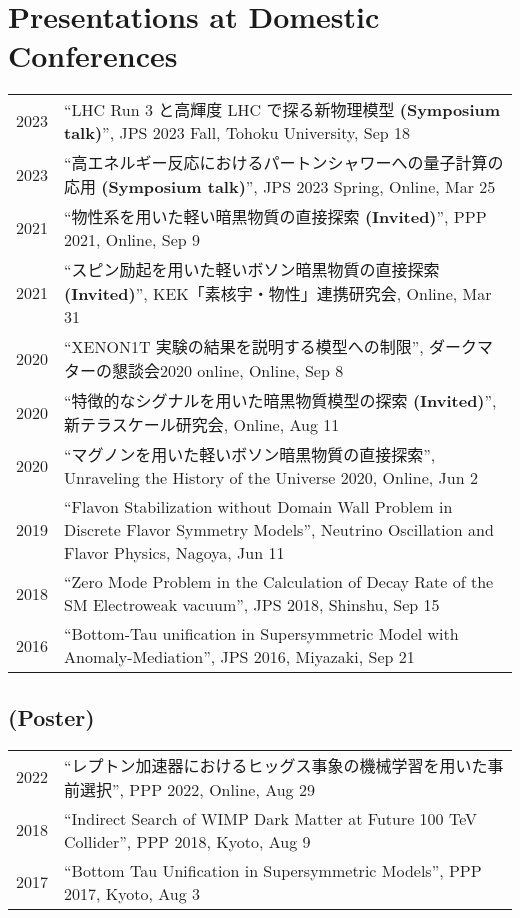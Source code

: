 \documentclass[12pt]{article}
\begin{document}
\section*{Presentations at Domestic Conferences}
\begin{table}[H]\begin{tabular}{lp{6in}}2023 & ``LHC Run 3 と高輝度 LHC で探る新物理模型 \textbf{(Symposium talk)}'', JPS 2023 Fall, Tohoku University, Sep 18 \\2023 & ``高エネルギー反応におけるパートンシャワーへの量子計算の応用 \textbf{(Symposium talk)}'', JPS 2023 Spring, Online, Mar 25 \\2021 & ``物性系を用いた軽い暗黒物質の直接探索 \textbf{(Invited)}'', PPP 2021, Online, Sep 9 \\2021 & ``スピン励起を用いた軽いボソン暗黒物質の直接探索 \textbf{(Invited)}'', KEK「素核宇・物性」連携研究会, Online, Mar 31 \\2020 & ``XENON1T 実験の結果を説明する模型への制限'', ダークマターの懇談会2020 online, Online, Sep 8 \\2020 & ``特徴的なシグナルを用いた暗黒物質模型の探索 \textbf{(Invited)}'', 新テラスケール研究会, Online, Aug 11 \\2020 & ``マグノンを用いた軽いボソン暗黒物質の直接探索'', Unraveling the History of the Universe 2020, Online, Jun 2 \\2019 & ``Flavon Stabilization without Domain Wall Problem in Discrete Flavor Symmetry Models'', Neutrino Oscillation and Flavor Physics, Nagoya, Jun 11 \\2018 & ``Zero Mode Problem in the Calculation of Decay Rate of the SM Electroweak vacuum'', JPS 2018, Shinshu, Sep 15 \\2016 & ``Bottom-Tau unification in Supersymmetric Model with Anomaly-Mediation'', JPS 2016, Miyazaki, Sep 21 \\\end{tabular}\end{table}

\subsection*{(Poster)}
\begin{table}[H]\begin{tabular}{lp{6in}}2022 & ``レプトン加速器におけるヒッグス事象の機械学習を用いた事前選択'', PPP 2022, Online, Aug 29 \\2018 & ``Indirect Search of WIMP Dark Matter at Future 100 TeV Collider'', PPP 2018, Kyoto, Aug 9 \\2017 & ``Bottom Tau Unification in Supersymmetric Models'', PPP 2017, Kyoto, Aug 3 \\\end{tabular}\end{table}
\end{document}
